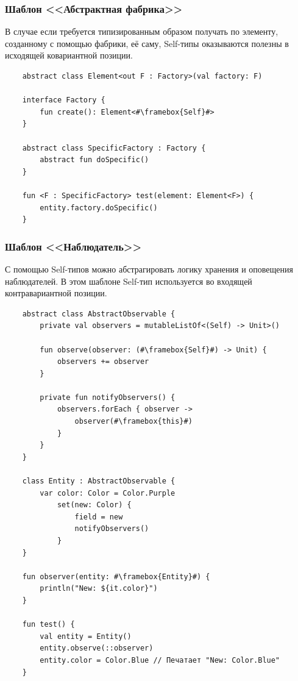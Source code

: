 \subsubsection{Шаблон <<Абстрактная фабрика>>}

В случае если требуется типизированным образом получать по элементу, созданному с помощью фабрики, её саму, Self-типы оказываются полезны в исходящей ковариантной позиции.

\begin{verbatim}
    abstract class Element<out F : Factory>(val factory: F)

    interface Factory {
        fun create(): Element<#\framebox{Self}#>
    }

    abstract class SpecificFactory : Factory {
        abstract fun doSpecific()
    }

    fun <F : SpecificFactory> test(element: Element<F>) {
        entity.factory.doSpecific()
    }
\end{verbatim}

\subsubsection{Шаблон <<Наблюдатель>>}

С помощью Self-типов можно абстрагировать логику хранения и оповещения наблюдателей.
В этом шаблоне Self-тип используется во входящей контравариантной позиции.

\begin{verbatim}
    abstract class AbstractObservable {
        private val observers = mutableListOf<(Self) -> Unit>()

        fun observe(observer: (#\framebox{Self}#) -> Unit) {
            observers += observer
        }

        private fun notifyObservers() {
            observers.forEach { observer ->
                observer(#\framebox{this}#)
            }
        }
    }

    class Entity : AbstractObservable {
        var color: Color = Color.Purple
            set(new: Color) {
                field = new
                notifyObservers()
            }
    }

    fun observer(entity: #\framebox{Entity}#) {
        println("New: ${it.color}")
    }

    fun test() {
        val entity = Entity()
        entity.observe(::observer)
        entity.color = Color.Blue // Печатает "New: Color.Blue"
    }
\end{verbatim}

